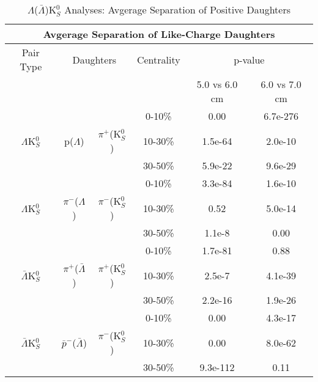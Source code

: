 \documentclass[../AnalysisNoteJBuxton.tex]{subfiles}
\begin{document}
\begin{table}
 \centering
 \begin{tabular}{|c|c|c|c|c|c|}
 \multicolumn{6}{c}{Avgerage Separation of Like-Charge Daughters} \\
  \hline
  Pair Type & \multicolumn{2}{|c|}{Daughters} & Centrality & \multicolumn{2}{c|}{p-value} \\
  \cline{5-6}
   & \multicolumn{2}{|c|}{} & & 5.0 vs 6.0 cm & 6.0 vs 7.0 cm \\
  \hline
   & & & 0-10\% & 0.00 & 6.7e-276 \\
  $\Lambda$K$^{0}_{S}$ & p($\Lambda$) & $\pi^{+}$(K$^{0}_{S}$) 
     & 10-30\% & 1.5e-64 & 2.0e-10 \\
   & & & 30-50\% & 5.9e-22 & 9.6e-29 \\
  \hline
   & & & 0-10\% & 3.3e-84 & 1.6e-10 \\
   $\Lambda$K$^{0}_{S}$ & $\pi^{-}$($\Lambda$) & $\pi^{-}$(K$^{0}_{S}$) 
     & 10-30\% & 0.52 & 5.0e-14 \\
   & & & 30-50\% & 1.1e-8 & 0.00 \\
  \hline \hline
   & & & 0-10\% & 1.7e-81 & 0.88 \\
   $\bar{\Lambda}$K$^{0}_{S}$ & $\pi^{+}$($\bar{\Lambda}$) & $\pi^{+}$(K$^{0}_{S}$) 
     & 10-30\% & 2.5e-7 & 4.1e-39 \\
   & & & 30-50\% & 2.2e-16 & 1.9e-26 \\
  \hline
   & & & 0-10\% & 0.00 & 4.3e-17 \\
   $\bar{\Lambda}$K$^{0}_{S}$ & $\bar{p}^{-}$($\bar{\Lambda}$) & $\pi^{-}$(K$^{0}_{S}$)
     & 10-30\% & 0.00 & 8.0e-62 \\
   & & & 30-50\% & 9.3e-112 & 0.11 \\
  \hline
 \end{tabular}
 \caption{$\Lambda$($\bar{\Lambda}$)K$^{0}_{S}$ Analyses: Avgerage Separation of Positive Daughters}
 \label{tab:AvgSepLamK0}
\end{table}
\end{document}
